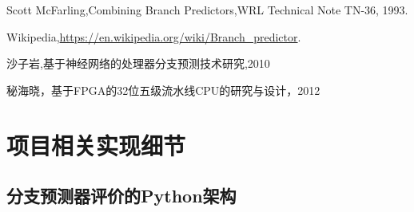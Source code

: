 \documentclass[forprint]{WHUBachelor}
\begin{document}
  
  \cleardoublepage{}
  \begin{thebibliography}{00}
  
     Scott McFarling,Combining Branch Predictors,WRL Technical Note TN-36, 1993.
  
     Wikipedia,\url{https://en.wikipedia.org/wiki/Branch_predictor}.
  
     沙子岩,基于神经网络的处理器分支预测技术研究,2010
  
     秘海晓，基于FPGA的32位五级流水线CPU的研究与设计，2012
  
  
  
  \end{thebibliography}
  
  
  \appendix
	\chapter{项目相关实现细节}
	\section{分支预测器评价的Python架构}
		
  
\end{document}
